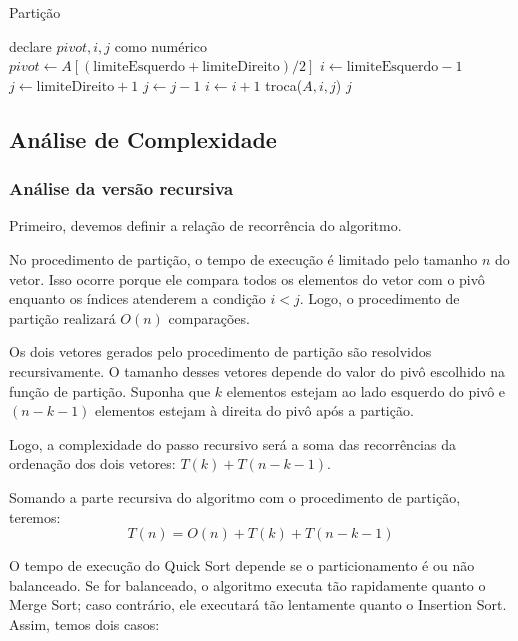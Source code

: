 \begin{algorithm}
	\caption{Partição}
	\label{algo:particao}
	\begin{algorithmic}[1]
		\State declare $pivot, i, j$ como numérico
		\State $pivot \gets A[(\text{limiteEsquerdo} + \text{limiteDireito}) / 2]$
		\State $i \gets \text{limiteEsquerdo}- 1$
		\State $j \gets \text{limiteDireito} + 1$
		\Repeat
		\State $j \gets j - 1$
		\Repeat
		\State $i \gets i + 1$
		\State troca($A, i, j$)
		\EndIf
		\EndWhile
		\State \Return $j$
		\EndFunction
	\end{algorithmic}
\end{algorithm}
\FloatBarrier

\subsection{Análise de Complexidade}

\subsubsection{Análise da versão recursiva}

Primeiro, devemos definir a relação de recorrência do algoritmo.

No procedimento de partição, o tempo de execução é limitado pelo tamanho \( n \) do vetor. Isso ocorre porque ele compara todos os elementos do vetor com o pivô enquanto os índices atenderem a condição \( i < j \). Logo, o procedimento de partição realizará \( O(n) \) comparações.

Os dois vetores gerados pelo procedimento de partição são resolvidos recursivamente. O tamanho desses vetores depende do valor do pivô escolhido na função de partição. Suponha que \( k \) elementos estejam ao lado esquerdo do pivô e \( (n - k - 1) \) elementos estejam à direita do pivô após a partição.

Logo, a complexidade do passo recursivo será a soma das recorrências da ordenação dos dois vetores: \( T(k) + T(n - k - 1) \).

Somando a parte recursiva do algoritmo com o procedimento de partição, teremos:
\[
	T(n) = O(n) + T(k) + T(n - k - 1)
\]

O tempo de execução do Quick Sort depende se o particionamento é ou não balanceado. Se for balanceado, o algoritmo executa tão rapidamente quanto o Merge Sort; caso contrário, ele executará tão lentamente quanto o Insertion Sort. Assim, temos dois casos:

